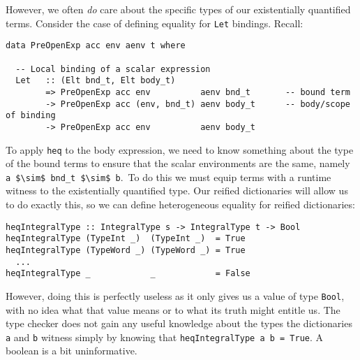 However, we often \emph{do} care about the specific types of our existentially
quantified terms. Consider the case of defining equality for \texttt{Let}
bindings. Recall:
%
\begin{lstlisting}[style=haskell]
data PreOpenExp acc env aenv t where

  -- Local binding of a scalar expression
  Let   :: (Elt bnd_t, Elt body_t)
        => PreOpenExp acc env          aenv bnd_t       -- bound term
        -> PreOpenExp acc (env, bnd_t) aenv body_t      -- body/scope of binding
        -> PreOpenExp acc env          aenv body_t
\end{lstlisting}
%
To apply \texttt{heq} to the body expression, we need to know something about
the type of the bound terms to ensure that the scalar environments are the same,
namely \lstinline[mathescape]{a $\sim$ bnd_t $\sim$ b}.\footnotemark\ To do
this we must equip terms with a runtime witness to the existentially quantified
type. Our reified dictionaries will allow us to do exactly this, so we can
define heterogeneous equality for reified dictionaries:
%
%
\begin{lstlisting}[style=haskell]
heqIntegralType :: IntegralType s -> IntegralType t -> Bool
heqIntegralType (TypeInt _)  (TypeInt _)  = True
heqIntegralType (TypeWord _) (TypeWord _) = True
  ...
heqIntegralType _            _            = False
\end{lstlisting}
%
However, doing this is perfectly useless as it only gives us a value of type
\texttt{Bool}, with no idea what that value means or to what its truth might
entitle us. The type checker does not gain any useful knowledge about the types
the dictionaries \texttt{a} and \texttt{b} witness simply by knowing that
\lstinline{heqIntegralType a b = True}. A boolean is a bit uninformative.

